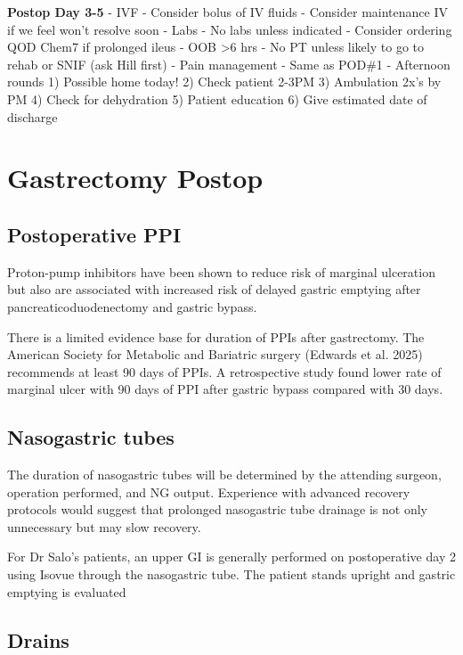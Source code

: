 \documentclass[
  letterpaper,
]{scrbook}
\begin{document}
\textbf{Postop Day 3-5} - IVF - Consider bolus of IV fluids - Consider
maintenance IV if we feel won't resolve soon - Labs - No labs unless
indicated - Consider ordering QOD Chem7 if prolonged ileus - OOB
\textgreater6 hrs - No PT unless likely to go to rehab or SNIF (ask Hill
first) - Pain management - Same as POD\#1 - Afternoon rounds 1) Possible
home today! 2) Check patient 2-3PM 3) Ambulation 2x's by PM 4) Check for
dehydration 5) Patient education 6) Give estimated date of discharge

\chapter{Gastrectomy Postop}\label{gastrectomy-postop}

\section{Postoperative PPI}\label{postoperative-ppi}

Proton-pump inhibitors have been shown to reduce risk of marginal
ulceration but also are associated with increased risk of delayed
gastric emptying after pancreaticoduodenectomy and gastric bypass.

There is a limited evidence base for duration of PPIs after gastrectomy.
The American Society for Metabolic and Bariatric surgery (Edwards et al.
2025) recommends at least 90 days of PPIs. A retrospective study found
lower rate of marginal ulcer with 90 days of PPI after gastric bypass
compared with 30 days.

\section{Nasogastric tubes}\label{nasogastric-tubes}

The duration of nasogastric tubes will be determined by the attending
surgeon, operation performed, and NG output. Experience with advanced
recovery protocols would suggest that prolonged nasogastric tube
drainage is not only unnecessary but may slow recovery.

For Dr Salo's patients, an upper GI is generally performed on
postoperative day 2 using Isovue through the nasogastric tube. The
patient stands upright and gastric emptying is evaluated

\section{Drains}\label{drains-2}
\end{document}
